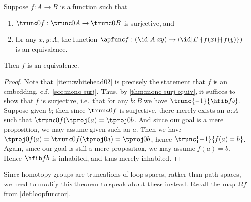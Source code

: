 {\begin{thm}\label{thm:whitehead0}
  Suppose $f:A\to B$ is a function such that
  \begin{enumerate}
  \item $\trunc0 f : \trunc0 A \to \trunc0 B$ is surjective, and\label{item:whitehead01}
  \item for any $x,y:A$, the function $\apfunc f : (\id[A]xy) \to (\id[B]{f(x)}{f(y)})$ is an equivalence.\label{item:whitehead02}
  \end{enumerate}
  Then $f$ is an equivalence.
\end{thm}
\begin{proof}
  Note that~\ref{item:whitehead02} is precisely the statement that $f$ is an embedding, c.f.~\cref{sec:mono-surj}.
  Thus, by \cref{thm:mono-surj-equiv}, it suffices to show that $f$ is surjective, i.e.\ that for any $b:B$ we have $\trunc{-1}{\hfib f b}$.
  Suppose given $b$; then since $\trunc0 f$ is surjective, there merely exists an $a:A$ such that $\trunc 0 f(\tproj0a) = \tproj0b$.
  And since our goal is a mere proposition, we may assume given such an $a$.
  Then we have $\tproj0{f(a)} = \trunc 0 f(\tproj0a) =\tproj0b$, hence $\trunc{-1}{f(a)=b}$.
  Again, since our goal is still a mere proposition, we may assume $f(a)=b$.
  Hence $\hfib f b$ is inhabited, and thus merely inhabited.
\end{proof}

Since homotopy groups are truncations of loop spaces, rather than path spaces, we need to modify this theorem to speak about these instead. Recall the map $\Omega f$ from \cref{def:loopfunctor}.

}
